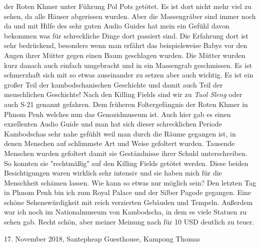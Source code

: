 \documentclass[11pt]{book}
\begin{document}
der Roten Khmer unter Führung Pol Pots getötet. Es ist dort nicht mehr viel zu sehen, da alle Häuser abgerissen wurden. Aber die 
Massengräber sind immer noch da und mit Hilfe des sehr guten Audio Guides hat mein ein Gefühl davon bekommen was für schreckliche 
Dinge dort passiert sind. Die Erfahrung dort ist sehr bedrückend, besonders wenn man erfährt das beispielsweise Babys vor den Augen 
ihrer Mütter gegen einen Baum geschlagen wurden. Die Mütter wurden kurz danach auch einfach umgebracht und in ein Massengrab geschmissen. 
Es ist schmerzhaft sich mit so etwas auseinander zu setzen aber auch wichtig. Es ist ein großer Teil der kambodschanischen Geschichte 
und damit auch Teil der menschlichen Geschichte! Nach den Killing Fields sind wir zu \emph{Tuol Sleng} oder auch S-21 genannt gefahren. 
Dem früheren Foltergefängnis der Roten Khmer in Phnom Penh welches nun das Genozidmuseum ist. Auch hier gab es einen exzellenten 
Audio Guide und man hat sich dieser schrecklichen Periode Kambodschas sehr nahe gefühlt weil man durch die Räume gegangen ist, in 
denen Menschen auf schlimmste Art und Weise gefoltert wurden. Tausende Menschen wurden gefoltert damit sie Geständnisse ihrer Schuld 
unterschreiben. So konnten sie "rechtmäßig" auf den Killing Fields getötet werden. Diese beiden Besichtigungen waren wirklich sehr 
intensiv und sie haben mich für die Menschheit schämen lassen. Wie kann so etwas nur möglich sein?
Den letzten Tag in Phnom Penh bin ich zum Royal Palace und der Silber Pagode gegangen. Eine schöne Sehenswürdigkeit mit reich verzierten 
Gebäuden und Tempeln. Außerdem war ich noch im Nationalmuseum von Kambodscha, in dem es viele Statuen zu sehen gab. Recht schön, aber 
meiner Meinung nach für 10 USD deutlich zu teuer. 


17. November 2018, Santepheap Guesthouse, Kampong Thomas
\end{document}
